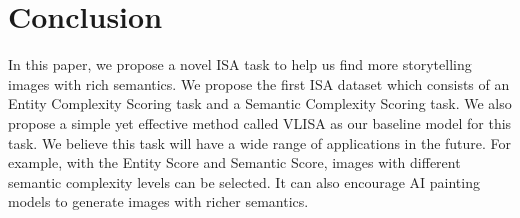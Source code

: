 \section{Conclusion}

In this paper, we propose a novel ISA task to help us find more storytelling images with rich semantics. 
We propose the first ISA dataset which consists of an Entity Complexity Scoring task and a Semantic Complexity Scoring task.
We also propose a simple yet effective method called VLISA as our baseline model for this task.
We believe this task will have a wide range of applications in the future.
For example, with the Entity Score and Semantic Score, images with different semantic complexity levels can be selected.
It can also encourage AI painting models to generate images with richer semantics.
